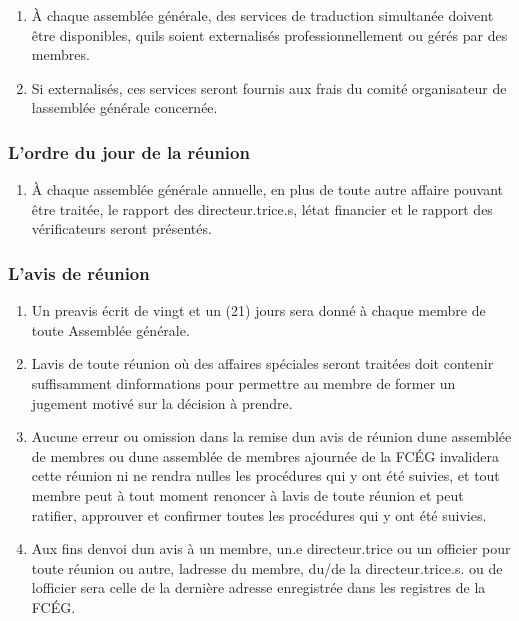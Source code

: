 \begin{enumerate}
 \item
  À chaque assemblée générale, des services de traduction simultanée doivent être disponibles, qu\textquotesingle ils soient externalisés professionnellement ou gérés par des membres.
 \item
  Si externalisés, ces services seront fournis aux frais du comité organisateur de l\textquotesingle assemblée générale concernée.
\end{enumerate}

\subsubsection{L'ordre du jour de la réunion}
\label{l-ordre-du-jour-de-la-reunion}

\begin{enumerate}
 \item
  À chaque assemblée générale annuelle, en plus de toute autre affaire pouvant être traitée, le rapport des directeur.trice.s, l\textquotesingle état financier et le rapport des vérificateurs seront présentés.
\end{enumerate}

\subsubsection{L'avis de réunion}
\label{l-avis-de-reunion}

\begin{enumerate}
 \item
  Un preavis écrit de vingt et un (21) jours sera donné à chaque membre de toute Assemblée générale.
 \item
  L\textquotesingle avis de toute réunion où des affaires spéciales seront traitées doit contenir suffisamment d\textquotesingle informations pour permettre au membre de former un jugement motivé sur la décision à prendre.
 \item
  Aucune erreur ou omission dans la remise d\textquotesingle un avis de réunion d\textquotesingle une assemblée de membres ou d\textquotesingle une assemblée de membres ajournée de la FCÉG invalidera cette réunion ni ne rendra nulles les procédures qui y ont été suivies, et tout membre peut à tout moment renoncer à l\textquotesingle avis de toute réunion et peut ratifier, approuver et confirmer toutes les procédures qui y ont été suivies.
 \item
  Aux fins d\textquotesingle envoi d\textquotesingle un avis à un membre, un.e directeur.trice ou un officier pour toute réunion ou autre, l\textquotesingle adresse du membre, du/de la directeur.trice.s. ou de l\textquotesingle officier sera celle de la dernière adresse enregistrée dans les registres de la FCÉG.
\end{enumerate}

